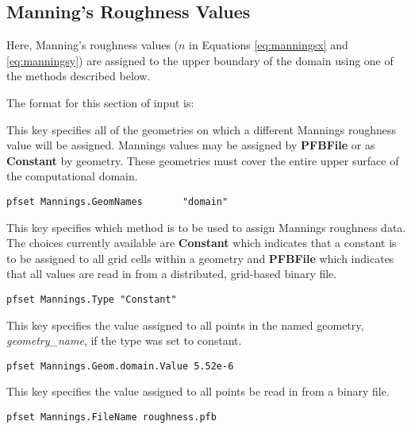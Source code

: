 \subsection{Manning's Roughness Values}
\label{Manning's Roughness Values}

Here, Manning's roughness values ($n$ in Equations \ref{eq:manningsx} and \ref{eq:manningsy}) are assigned to the upper boundary of the domain using one of the methods described below.

The format for this section of input is:

{
This key specifies all of the geometries on which a different Mannings roughness value will be 
assigned.  Mannings values may be assigned by {\bf PFBFile} or as {\bf Constant} by geometry.  These geometries must cover the entire upper surface of the computational domain.
}
\begin{display}\begin{verbatim}
pfset Mannings.GeomNames       "domain"
\end{verbatim}\end{display}

{
This key specifies which method is to be used to assign Mannings roughness data.  The choices currently
available are {\bf Constant} which indicates that a constant is to be
assigned to all grid cells within a geometry and {\bf PFBFile} which indicates that all values are read in from a distributed, grid-based \parflow{} binary file.
}
\begin{display}\begin{verbatim}
pfset Mannings.Type "Constant"
\end{verbatim}\end{display}

{
This key specifies the value assigned to all points in the named
geometry, {\em geometry\_name}, if the type was set to constant.
}
\begin{display}\begin{verbatim}
pfset Mannings.Geom.domain.Value 5.52e-6
\end{verbatim}\end{display}

{
This key specifies the value assigned to all points be read in from a \parflow{} binary file.
}
\begin{display}\begin{verbatim}
pfset Mannings.FileName roughness.pfb
\end{verbatim}\end{display}


